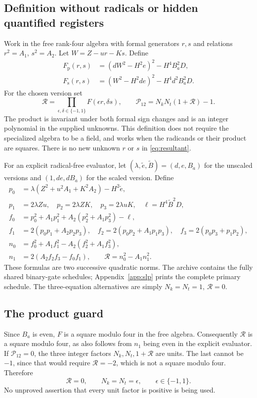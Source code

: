 \documentclass[11pt]{article}
\begin{document}
\subsection{Definition without radicals or hidden quantified registers}
Work in the free rank-four algebra with formal generators $r,s$ and relations $r^2=A_1$, $s^2=A_2$. Let $W=Z-ur-Ks$. Define
\begin{align}
 F_{\mathrm{p}}(r,s)&=(dW^2-H^2e)^2-H^4B_a^2D,\label{eq:Fprimary}\\
 F_{\mathrm{s}}(r,s)&=(W^2-H^2de)^2-H^4d^2B_a^2D.\label{eq:Fscaled}
\end{align}
For the chosen version set
\begin{equation}\label{eq:resultant}
 \mathcal R=\prod_{\epsilon,\delta\in\{-1,1\}}F(\epsilon r,\delta s),
 \qquad \mathcal P_{12}=N_kN_t(1+\mathcal R)-1.
\end{equation}
The product is invariant under both formal sign changes and is an integer polynomial in the supplied unknowns. This definition does not require the specialized algebra to be a field, and works when the radicands or their product are squares. There is no new unknown $r$ or $s$ in \eqref{eq:resultant}.

For an explicit radical-free evaluator, let $(\lambda,\widetilde e,\widetilde B)=(d,e,B_a)$ for the unscaled versions and $(1,de,dB_a)$ for the scaled version. Define
\begin{align*}
 p_0&=\lambda(Z^2+u^2A_1+K^2A_2)-H^2\widetilde e,\\
 p_1&=2\lambda Zu,\quad p_2=2\lambda ZK,\quad p_3=2\lambda uK,
 \quad\ell=H^4\widetilde B^2D,\\
 f_0&=p_0^2+A_1p_1^2+A_2(p_2^2+A_1p_3^2)-\ell,\\
 f_1&=2(p_0p_1+A_2p_2p_3),\quad
 f_2=2(p_0p_2+A_1p_1p_3),\quad
 f_3=2(p_0p_3+p_1p_2),\\
 n_0&=f_0^2+A_1f_1^2-A_2(f_2^2+A_1f_3^2),\\
 n_1&=2(A_2f_2f_3-f_0f_1),\qquad
 \mathcal R=n_0^2-A_1n_1^2.
\end{align*}
These formulas are two successive quadratic norms. The archive contains the fully shared binary-gate schedules; Appendix~\ref{app:slp} prints the complete primary schedule. The three-equation alternatives are simply $N_k=N_t=1$, $\mathcal R=0$.

\subsection{The product guard}
Since $B_a$ is even, $F$ is a square modulo four in the free algebra. Consequently $\mathcal R$ is a square modulo four, as also follows from $n_1$ being even in the explicit evaluator. If $\mathcal P_{12}=0$, the three integer factors $N_k,N_t,1+\mathcal R$ are units. The last cannot be $-1$, since that would require $\mathcal R=-2$, which is not a square modulo four. Therefore
\[
 \mathcal R=0,\qquad N_k=N_t=\epsilon,\qquad\epsilon\in\{-1,1\}.
\]
No unproved assertion that every unit factor is positive is being used.
\end{document}
